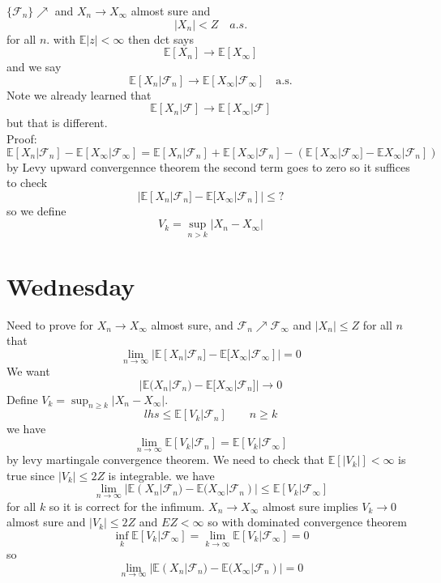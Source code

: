 \documentclass[11pt]{article}
\begin{document}
$ \{ \mathcal{F}_n\} \nearrow$ and $X_n \to X_\infty$ almost sure and 
\[
|X_n| < Z \quad a.s.
\] 
for all $n$. with $ \mathbb{E}|z| < \infty$
then
dct says
 \[
     \mathbb{E}[X_n] \to \mathbb{E}[X_\infty]
\] 
and we say
\[
    \mathbb{E}[X_n | \mathcal{F}_n] \to \mathbb{E}[X_\infty | \mathcal{F}_\infty]  \quad \text{a.s.}
\] 
Note we already learned that
\[
    \mathbb{E}[X_n | \mathcal{F}] \to \mathbb{E}[X_\infty | \mathcal{F}]
\] 
but that is different.\\
Proof:
\[
    \mathbb{E}[X_n | \mathcal{F}_n]  - \mathbb{E}[X_\infty | \mathcal{F}_\infty] 
    = \mathbb{E}[X_n | \mathcal{F}_n] + \mathbb{E}[X_\infty | \mathcal{F}_n] - ( \mathbb{E}[X_\infty | \mathcal{F}_\infty] - \mathbb{E}X_\infty | \mathcal{F}_n])
\] 
by Levy upward convergennce theorem the second term goes to zero so it suffices to check
\[
 |   \mathbb{E}[X_n | \mathcal{F}_n] - \mathbb{E}[X_\infty | \mathcal{F}_n] |\le ?
\] 
so we define
\[
    V_k = \sup_{n > k} |X_n - X_\infty|
\] 

\section{Wednesday}
Need to prove for $X_n \to X_\infty $ almost sure, and $ \mathcal{F}_n \nearrow \mathcal{F}_\infty$ and $|X_n| \le Z$ for all  $n$ that
 \[
     \lim_{n\to \infty} |\mathbb{E}[X_n | \mathcal{F}_n] -  \mathbb{E}[X_\infty | \mathcal{F}_\infty]| = 0
\] 
We want 
\[
    | \mathbb{E}(X_n | \mathcal{F}_n) - \mathbb{E}[X_\infty | \mathcal{F}_n] | \to 0
\] 
Define $V_k = \sup_{n \ge k} | X_n - X_\infty|$.
\[
    lhs \le \mathbb{E}[V_k | \mathcal{F}_n] \qquad n \ge k
\] 
we have
\[
    \lim_{n\to \infty} \mathbb{E}[V_k | \mathcal{F}_n] = \mathbb{E}[ V_k | \mathcal{F}_\infty]
\] 
by levy martingale convergence theorem.
We need to check that $ \mathbb{E}[|V_k|] < \infty$ is true since $ |V_k| \le 2Z$ is integrable.
we have
\[
    \lim_{n\to \infty} | \mathbb{E}(X_n | \mathcal{F}_n) - \mathbb{E}(X_\infty | \mathcal{F}_n)| \le \mathbb{E}[V_k | \mathcal{F}_\infty]
\] 
for all $k$ so it is correct for the infimum.  $X_n \to X_\infty$ almost sure implies $V_k \to 0$ almost sure and  $|V_k| \le 2Z$ and  $E Z < \infty$ so with dominated convergence theorem
\[
    \inf_k \mathbb{E}[V_k | \mathcal{F}_\infty] = \lim_{k\to \infty} \mathbb{E}[V_k | \mathcal{F}_\infty]  = 0
\] 
so
\[
\lim_{n\to \infty} | \mathbb{E}(X_n | \mathcal{F}_n) - \mathbb{E}(X_\infty | \mathcal{F}_n)| = 0
\] 
\end{document}
